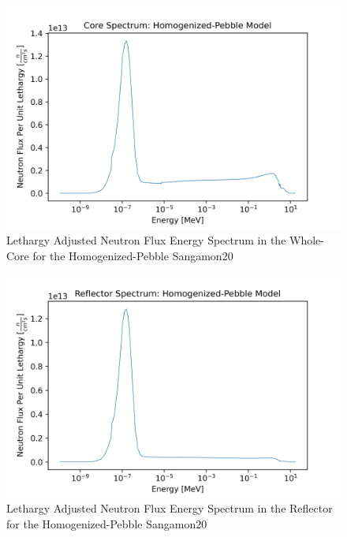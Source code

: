 \begin{figure}[H]
\centering
  \includegraphics[width=0.95\linewidth]{figures/core_spec_homog_v2}
  \caption{Lethargy Adjusted Neutron Flux Energy Spectrum in the Whole-Core for the Homogenized-Pebble Sangamon20}
  \label{fig:hom-core}
\end{figure}

\begin{figure}[H]
\centering
  \includegraphics[width=0.95\linewidth]{figures/reflect_spec_homog_v2}
  \caption{Lethargy Adjusted Neutron Flux Energy Spectrum in the Reflector for the Homogenized-Pebble Sangamon20}
  \label{fig:hom-reflec}
\end{figure}
